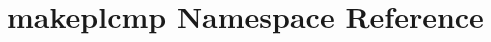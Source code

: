 \hypertarget{namespacemakeplcmp}{\section{makeplcmp Namespace Reference}
\label{namespacemakeplcmp}
}
